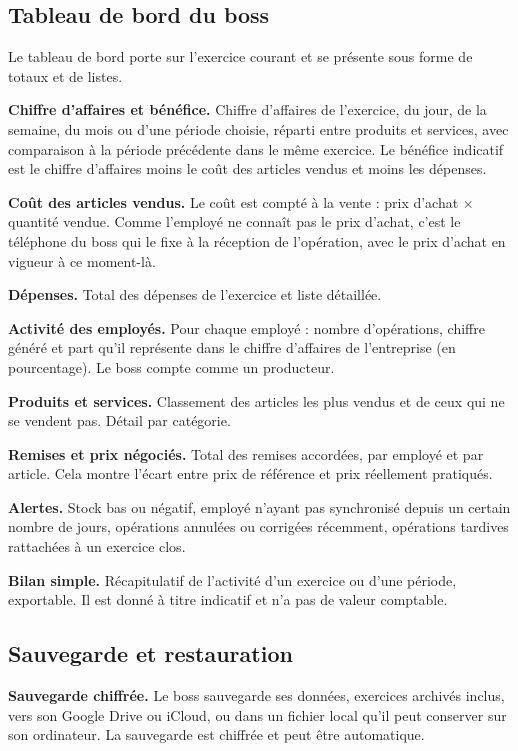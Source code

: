 \documentclass[11pt,a4paper]{article}
\newcommand{\fonc}[2]{\textbf{#1.} #2\par\vspace{0.2em}}
\begin{document}
	\subsection{Tableau de bord du boss}
	
	Le tableau de bord porte sur l'exercice courant et se présente sous forme de totaux et de listes.
	
	\fonc{Chiffre d'affaires et bénéfice}{Chiffre d'affaires de l'exercice, du jour, de la semaine, du mois ou d'une période choisie, réparti entre produits et services, avec comparaison à la période précédente dans le même exercice. Le bénéfice indicatif est le chiffre d'affaires moins le coût des articles vendus et moins les dépenses.}
	
	\fonc{Coût des articles vendus}{Le coût est compté à la vente : prix d'achat $\times$ quantité vendue. Comme l'employé ne connaît pas le prix d'achat, c'est le téléphone du boss qui le fixe à la réception de l'opération, avec le prix d'achat en vigueur à ce moment-là.}
	
	\fonc{Dépenses}{Total des dépenses de l'exercice et liste détaillée.}
	
	\fonc{Activité des employés}{Pour chaque employé : nombre d'opérations, chiffre généré et part qu'il représente dans le chiffre d'affaires de l'entreprise (en pourcentage). Le boss compte comme un producteur.}
	
	\fonc{Produits et services}{Classement des articles les plus vendus et de ceux qui ne se vendent pas. Détail par catégorie.}
	
	\fonc{Remises et prix négociés}{Total des remises accordées, par employé et par article. Cela montre l'écart entre prix de référence et prix réellement pratiqués.}
	
	\fonc{Alertes}{Stock bas ou négatif, employé n'ayant pas synchronisé depuis un certain nombre de jours, opérations annulées ou corrigées récemment, opérations tardives rattachées à un exercice clos.}
	
	\fonc{Bilan simple}{Récapitulatif de l'activité d'un exercice ou d'une période, exportable. Il est donné à titre indicatif et n'a pas de valeur comptable.}
	
	\subsection{Sauvegarde et restauration}
	
	\fonc{Sauvegarde chiffrée}{Le boss sauvegarde ses données, exercices archivés inclus, vers son Google Drive ou iCloud, ou dans un fichier local qu'il peut conserver sur son ordinateur. La sauvegarde est chiffrée et peut être automatique.}
	
\end{document}

